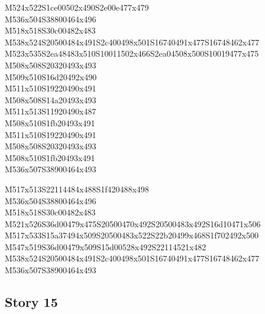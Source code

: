 \documentclass{article}
\begin{document}
\begin{multicols}{5}
\begin{center}
M524x522S1ce00502x490S2e00e477x479 %
\\M536x504S38800464x496 %
\\M518x518S30c00482x483 %
\\M538x524S20500484x491S2c400498x501S16740491x477S16748462x477 %
\\M523x535S2ea48483x510S10011502x466S2ea04508x500S10019477x475 %
\\M508x508S20320493x493 %
\\M509x510S16d20492x490 %
\\M511x510S19220490x491 %
\\M508x508S14a20493x493 %
\\M511x513S11920490x487 %
\\M508x510S1fb20493x491 %
\\M511x510S19220490x491 %
\\M508x508S20320493x493 %
\\M508x510S1fb20493x491 %
\\M536x507S38900464x493 %
\vfil
\columnbreak

M517x513S22114484x488S1f420488x498 %
\\M536x504S38800464x496 %
\\M518x518S30c00482x483 %
\\M521x526S36d00479x475S20500470x492S20500483x492S16d10471x506 %
\\M517x533S15a37494x509S20500483x522S22b20499x468S1f702492x500 %
\\M547x519S36d00479x509S15d00528x492S22114521x482 %
\\M538x524S20500484x491S2c400498x501S16740491x477S16748462x477 %
\\M536x507S38900464x493 %
\vfil

\end{center}
\end{multicols}

\subsection{Story 15}
\end{document}
